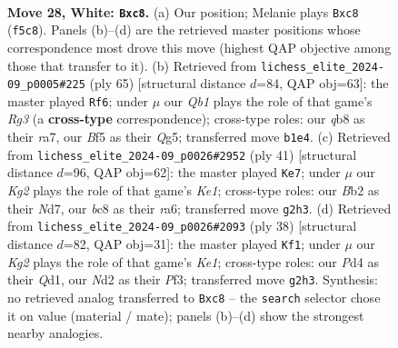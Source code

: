 \documentclass[11pt]{article}
\begin{document}
\clearpage

\begin{figure}[p]\centering
\begin{subfigure}{0.46\textwidth}\centering
\resizebox{\linewidth}{!}{%
\newchessgame
\chessboard[
  setfen={rqb1k2r/p3b1pp/8/n2p1B2/p2P3P/4P1P1/1B1N2K1/1Q2R3 w - - 0 28},
  showmover=false,
  pgfstyle=straightmove, color=movearrow, markmove={f5-c8}
]}
\caption{}
\end{subfigure}\hfill
\begin{subfigure}{0.46\textwidth}\centering
\resizebox{\linewidth}{!}{%
\newchessgame
\chessboard[
  setfen={8/R5bk/2p1b1r1/1p2p1q1/1P2P1Pp/8/P3BQ2/4R1K1 b - - 0 33},
  showmover=false,
  pgfstyle=straightmove, color=movearrow, markmove={g6-f6}
]}
\caption{}
\end{subfigure}
\\[4pt]
\begin{subfigure}{0.46\textwidth}\centering
\resizebox{\linewidth}{!}{%
\newchessgame
\chessboard[
  setfen={1q2k2r/3n1ppp/R2b4/3p4/QppP4/6P1/1B2PPBP/6K1 b k - 1 21},
  showmover=false,
  pgfstyle=straightmove, color=movearrow, markmove={e8-e7}
]}
\caption{}
\end{subfigure}\hfill
\begin{subfigure}{0.46\textwidth}\centering
\resizebox{\linewidth}{!}{%
\newchessgame
\chessboard[
  setfen={rn2kr2/pp2q3/2p3R1/6b1/2Pp2N1/P2P1P2/1P2B3/R2QK3 w Qq - 1 20},
  showmover=false,
  pgfstyle=straightmove, color=movearrow, markmove={e1-f1}
]}
\caption{}
\end{subfigure}
\caption{\textbf{Move 28, White: \texttt{Bxc8}.} (a) Our position; Melanie plays \texttt{Bxc8} (\texttt{f5c8}). Panels (b)--(d) are the retrieved master positions whose correspondence most drove this move (highest QAP objective among those that transfer to it). (b) Retrieved from \texttt{lichess\_elite\_2024-09\_p0005\#225} (ply 65) [structural distance $d$=84, QAP obj=63]: the master played \texttt{Rf6}; under $\mu$ our \emph{Qb1} plays the role of that game's \emph{Rg3} (a \textbf{cross-type} correspondence); cross-type roles: our \emph{q}b8 as their \emph{r}a7, our \emph{B}f5 as their \emph{Q}g5; transferred move \texttt{b1e4}. (c) Retrieved from \texttt{lichess\_elite\_2024-09\_p0026\#2952} (ply 41) [structural distance $d$=96, QAP obj=62]: the master played \texttt{Ke7}; under $\mu$ our \emph{Kg2} plays the role of that game's \emph{Ke1}; cross-type roles: our \emph{B}b2 as their \emph{N}d7, our \emph{b}c8 as their \emph{r}a6; transferred move \texttt{g2h3}. (d) Retrieved from \texttt{lichess\_elite\_2024-09\_p0026\#2093} (ply 38) [structural distance $d$=82, QAP obj=31]: the master played \texttt{Kf1}; under $\mu$ our \emph{Kg2} plays the role of that game's \emph{Ke1}; cross-type roles: our \emph{P}d4 as their \emph{Q}d1, our \emph{N}d2 as their \emph{P}f3; transferred move \texttt{g2h3}. Synthesis: no retrieved analog transferred to \texttt{Bxc8} -- the \texttt{search} selector chose it on value (material / mate); panels (b)--(d) show the strongest nearby analogies.}
\label{fig:thought-m54}
\end{figure}
\end{document}

